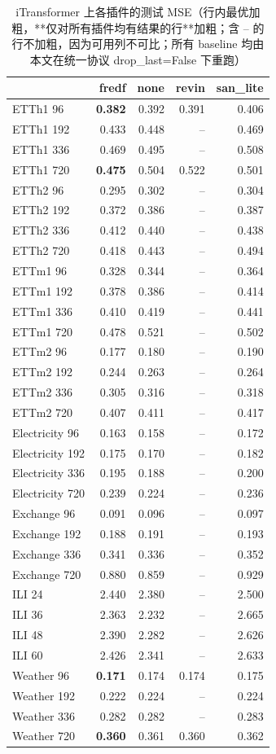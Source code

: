 \begin{table}[htbp]
\centering
\small
\caption{iTransformer 上各插件的测试 MSE（行内最优加粗，**仅对所有插件均有结果的行**加粗；含 -- 的行不加粗，因为可用列不可比；所有 baseline 均由本文在统一协议 drop\_last=False 下重跑）}
\label{tab:main_itransformer}
\begin{tabular}{lrrrr}
\toprule
 & fredf & none & revin & san\_lite \\
\midrule
ETTh1 96 & \textbf{0.382} & 0.392 & 0.391 & 0.406 \\
ETTh1 192 & 0.433 & 0.448 & -- & 0.469 \\
ETTh1 336 & 0.469 & 0.495 & -- & 0.508 \\
ETTh1 720 & \textbf{0.475} & 0.504 & 0.522 & 0.501 \\
ETTh2 96 & 0.295 & 0.302 & -- & 0.304 \\
ETTh2 192 & 0.372 & 0.386 & -- & 0.387 \\
ETTh2 336 & 0.412 & 0.440 & -- & 0.438 \\
ETTh2 720 & 0.418 & 0.443 & -- & 0.494 \\
ETTm1 96 & 0.328 & 0.344 & -- & 0.364 \\
ETTm1 192 & 0.378 & 0.386 & -- & 0.414 \\
ETTm1 336 & 0.410 & 0.419 & -- & 0.441 \\
ETTm1 720 & 0.478 & 0.521 & -- & 0.502 \\
ETTm2 96 & 0.177 & 0.180 & -- & 0.190 \\
ETTm2 192 & 0.244 & 0.263 & -- & 0.264 \\
ETTm2 336 & 0.305 & 0.316 & -- & 0.318 \\
ETTm2 720 & 0.407 & 0.411 & -- & 0.417 \\
Electricity 96 & 0.163 & 0.158 & -- & 0.172 \\
Electricity 192 & 0.175 & 0.170 & -- & 0.182 \\
Electricity 336 & 0.195 & 0.188 & -- & 0.200 \\
Electricity 720 & 0.239 & 0.224 & -- & 0.236 \\
Exchange 96 & 0.091 & 0.096 & -- & 0.097 \\
Exchange 192 & 0.188 & 0.191 & -- & 0.193 \\
Exchange 336 & 0.341 & 0.336 & -- & 0.352 \\
Exchange 720 & 0.880 & 0.859 & -- & 0.929 \\
ILI 24 & 2.440 & 2.380 & -- & 2.500 \\
ILI 36 & 2.363 & 2.232 & -- & 2.665 \\
ILI 48 & 2.390 & 2.282 & -- & 2.626 \\
ILI 60 & 2.426 & 2.341 & -- & 2.633 \\
Weather 96 & \textbf{0.171} & 0.174 & 0.174 & 0.175 \\
Weather 192 & 0.222 & 0.224 & -- & 0.224 \\
Weather 336 & 0.282 & 0.282 & -- & 0.283 \\
Weather 720 & \textbf{0.360} & 0.361 & 0.360 & 0.362 \\
\bottomrule
\end{tabular}
\end{table}
